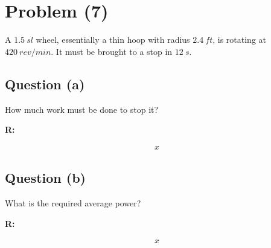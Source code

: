 \section{Problem (7)}
	A $1.5 \ sl$ wheel, essentially a thin hoop with radius $2.4 \ ft$, is rotating at $420 \ rev/min$. It must be brought to a stop in $12 \ s$.

	\subsection{Question (a)}

		How much work must be done to stop it?

		\textbf{R:}

		\begin{align}
			x
		\end{align}

	\subsection{Question (b)}

		What is the required average power?

		\textbf{R:}

		\begin{align}
			x
		\end{align}
